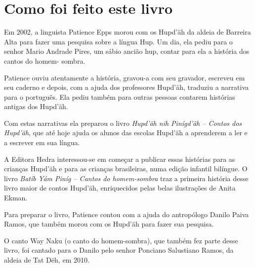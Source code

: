 \chapter{Como foi feito este livro}

Em 2002, a linguista Patience Epps morou com os Hupd’äh da aldeia de Barreira Alta para fazer uma pesquisa sobre a língua Hup. Um dia, ela pediu para o senhor Mario Andrade Pires, um sábio ancião hup, contar para ela a história dos cantos do homem­- sombra.

Patience ouviu atentamente a história, gravou­-a com seu gravador, escreveu em seu caderno e depois, com a ajuda dos professores Hupd’äh, traduziu a narrativa para o português. Ela pediu também para outras pessoas contarem histórias antigas dos Hupd’äh.

Com estas narrativas ela preparou o livro \textit{Hupd’äh nih Pinígd’äh -- Contos
dos Hupd’äh}, que até hoje ajuda os alunos das escolas Hupd’äh a aprenderem a ler e a escrever em sua língua.

A Editora Hedra interessou-­se em começar a publicar essas histórias para as crianças Hupd’äh e para as crianças brasileiras, numa edição infantil bilíngue. O livro \textit{Batíb Yám Piníg -- Cantos do homem­-sombra} traz a primeira história desse livro maior de contos
Hupd’äh, enriquecidos pelas belas ilustrações de Anita Ekman.

Para preparar o livro, Patience contou com a ajuda do antropólogo Danilo Paiva Ramos, que também morou com os Hupd’äh para fazer sua pesquisa.

O canto Way Naku (o canto do homem-­sombra), que também fez parte desse livro, foi cantado
para o Danilo pelo senhor Ponciano Salustiano Ramos, da aldeia de Tat­ Dëh, em 2010.


